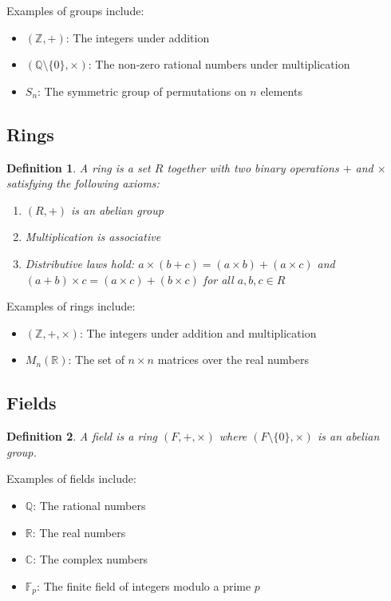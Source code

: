 \documentclass[12pt,a4paper]{article}
\newtheorem{definition}{Definition}
\begin{document}
Examples of groups include:
\begin{itemize}
    \item $(\mathbb{Z}, +)$: The integers under addition
    \item $(\mathbb{Q} \setminus \{0\}, \times)$: The non-zero rational numbers under multiplication
    \item $S_n$: The symmetric group of permutations on $n$ elements
\end{itemize}

\subsection{Rings}

\begin{definition}
A ring is a set $R$ together with two binary operations $+$ and $\times$ satisfying the following axioms:
\begin{enumerate}
    \item $(R, +)$ is an abelian group
    \item Multiplication is associative
    \item Distributive laws hold: $a \times (b + c) = (a \times b) + (a \times c)$ and $(a + b) \times c = (a \times c) + (b \times c)$ for all $a, b, c \in R$
\end{enumerate}
\end{definition}

Examples of rings include:
\begin{itemize}
    \item $(\mathbb{Z}, +, \times)$: The integers under addition and multiplication
    \item $M_n(\mathbb{R})$: The set of $n \times n$ matrices over the real numbers
\end{itemize}

\subsection{Fields}

\begin{definition}
A field is a ring $(F, +, \times)$ where $(F \setminus \{0\}, \times)$ is an abelian group.
\end{definition}

Examples of fields include:
\begin{itemize}
    \item $\mathbb{Q}$: The rational numbers
    \item $\mathbb{R}$: The real numbers
    \item $\mathbb{C}$: The complex numbers
    \item $\mathbb{F}_p$: The finite field of integers modulo a prime $p$
\end{itemize}
\end{document}
